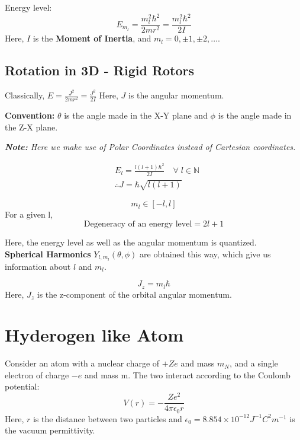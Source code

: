 \documentclass[12pt]{extarticle}
\begin{document}
Energy level:
\begin{equation}
	E_{m_l} = \frac{m_l^2 \hbar^2}{2mr^2} = \frac{m_l^2 \hbar^2}{2I} 
\end{equation}
Here, $I$ is the \textbf{Moment of Inertia}, and $m_l = 0, \pm 1, \pm 2, \dots$.

\subsection{Rotation in 3D - Rigid Rotors}
Classically, $E = \frac{J^2}{2mr^2} = \frac{J^2}{2I}$
Here, $J$ is the angular momentum.

\textbf{Convention:} $\theta$ is the angle made in the X-Y plane and $\phi$ is the angle made in the Z-X plane.

\textit{ \textbf{Note:} Here we make use of Polar Coordinates instead of Cartesian coordinates.} 

\begin{align}
	&E_l = \frac{l(l+1) \hbar^2}{2I}\quad\forall\;l \in \mathbb{N} \\
	&\therefore J = \hbar \sqrt{l(l + 1)}
\end{align}

\[
	m_l \in [-l, l]
\]
For a given l,
\[
	\textrm{Degeneracy of an energy level} = 2l + 1
\]

Here, the energy level as well as the angular momentum is quantized.\\

\textbf{Spherical Harmonics} $Y_{l, m_l}(\theta, \phi)$ are obtained this way, which give us information about $l$ and $m_l$.

\begin{equation}
	J_z = m_l \hbar
\end{equation}
Here, $J_z$ is the z-component of the orbital angular momentum.

\section{Hyderogen like Atom}
Consider an atom with a nuclear charge of $+Ze$ and mass $m_N$, and a single electron of charge $-e$ and mass m. The two interact according to the Coulomb potential:
\begin{equation}
	V(r) = - \frac{Ze^2}{4\pi \epsilon_0 r} 
\end{equation}
Here, $r$ is the distance between two particles and $\epsilon_0 = 8.854 \times 10^{-12} J^{-1} C^2 m^{-1}$ is the vacuum permittivity.
\end{document}
